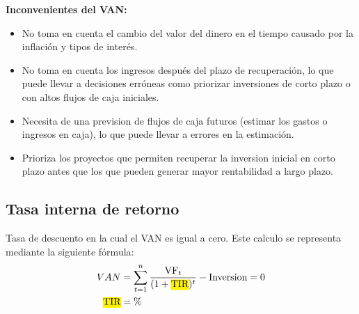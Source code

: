 \documentclass{templateNote}
\begin{document}
\textbf{Inconvenientes del VAN:}
\begin{itemize}
    \item No toma en cuenta el cambio del valor del dinero en el tiempo causado por la inflación y tipos de interés.
    \item No toma en cuenta los ingresos después del plazo de recuperación, lo que puede llevar a decisiones erróneas como priorizar inversiones de corto plazo o con altos flujos de caja iniciales.
    \item Necesita de una prevision de flujos de caja futuros (estimar los gastos o ingresos en caja), lo que puede llevar a errores en la estimación.
    \item Prioriza los proyectos que permiten recuperar la inversion inicial en corto plazo antes que los que pueden generar mayor rentabilidad a largo plazo.
\end{itemize}

\subsection{Tasa interna de retorno}
\noindent Tasa de descuento en la cual el VAN es igual a cero. Este calculo se representa mediante la siguiente fórmula:
\begin{align*}
    VAN &= \sum_{t=1}^{n} \frac{{\textnormal{VF}}_t}{(1 + \textnormal{\hl{TIR}})^t} - \textnormal{Inversion} = 0\\
    \textnormal{\hl{TIR}} &= \% 
\end{align*}
\end{document}
